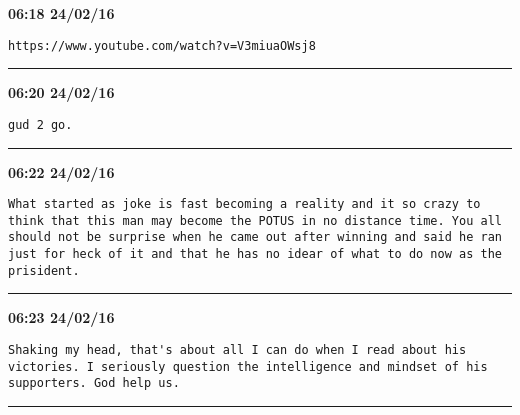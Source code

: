 \begin{adjustwidth}{0cm}{0cm}
\footnotesize \textbf{06:18 24/02/16}

\begin{lstlisting}[breaklines, breakatwhitespace, basicstyle=\small, frame=leftline]
https://www.youtube.com/watch?v=V3miuaOWsj8
\end{lstlisting}
\end{adjustwidth}

\hrule%

\begin{adjustwidth}{0cm}{0cm}
\footnotesize \textbf{06:20 24/02/16}

\begin{lstlisting}[breaklines, breakatwhitespace, basicstyle=\small, frame=leftline]
gud 2 go.
\end{lstlisting}
\end{adjustwidth}

\hrule%

\begin{adjustwidth}{0cm}{0cm}
\footnotesize \textbf{06:22 24/02/16}

\begin{lstlisting}[breaklines, breakatwhitespace, basicstyle=\small, frame=leftline]
What started as joke is fast becoming a reality and it so crazy to think that this man may become the POTUS in no distance time. You all should not be surprise when he came out after winning and said he ran just for heck of it and that he has no idear of what to do now as the prisident.
\end{lstlisting}
\end{adjustwidth}

\hrule%

\begin{adjustwidth}{0cm}{0cm}
\footnotesize \textbf{06:23 24/02/16}

\begin{lstlisting}[breaklines, breakatwhitespace, basicstyle=\small, frame=leftline]
Shaking my head, that's about all I can do when I read about his victories. I seriously question the intelligence and mindset of his supporters. God help us.
\end{lstlisting}
\end{adjustwidth}

\hrule%

